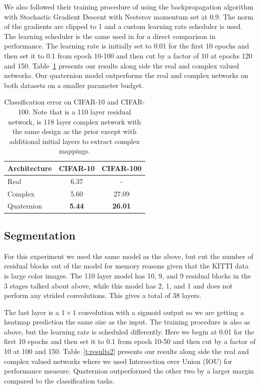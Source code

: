 We also followed their training procedure of using the backpropagation algorithm with Stochastic Gradient Descent with Nesterov momentum \cite{nesterov1983method} set at 0.9.
The norm of the gradients are clipped to 1 and a custom learning rate scheduler is used.
The learning scheduler is the same used in \cite{trabelsi2017deep} for a direct comparison in performance.
The learning rate is initially set to 0.01 for the first 10 epochs and then set it to 0.1 from epoch 10-100 and then cut by a factor of 10 at epochs 120 and 150.
Table~\ref{t:results1} presents our results along side the real and complex valued networks.
Our quaternion model outperforms the real and complex networks on both datasets on a smaller parameter budget.

\begin{table}[h]
	\centering
		\begin{tabular}{l c c}
			\hline
			Architecture & CIFAR-10 & CIFAR-100 \\
			\hline
			\cite{he2016deep} Real & 6.37 & - \\
			\cite{trabelsi2017deep} Complex & 5.60 & 27.09 \\
			Quaternion & \textbf{5.44} & \textbf{26.01}
		\end{tabular}
	\caption{Classification error on CIFAR-10 and CIFAR-100. Note that \cite{he2016deep} is a 110 layer residual network, \cite{trabelsi2017deep} is 118 layer complex network with the same design as the prior except with additional initial layers to extract complex mappings.}
	\label{t:results1}
\end{table}

\subsection{Segmentation}
For this experiment we used the same model as the above, but cut the number of residual blocks out of the model for memory reasons given that the KITTI data is large color images.
The 110 layer model has 10, 9, and 9 residual blocks in the 3 stages talked about above, while this model has 2, 1, and 1 and does not perform any strided convolutions.
This gives a total of 38 layers.

The last layer is a $1 \times 1$ convolution with a sigmoid output so we are getting a heatmap prediction the same size as the input.
The training procedure is also as above, but the learning rate is scheduled differently.
Here we begin at 0.01 for the first 10 epochs and then set it to 0.1 from epoch 10-50 and then cut by a factor of 10 at 100 and 150.
Table~\ref{t:results2} presents our results along side the real and complex valued networks where we used Intersection over Union (IOU) for performance measure.
Quaternion outperformed the other two by a larger margin compared to the classification tasks.

